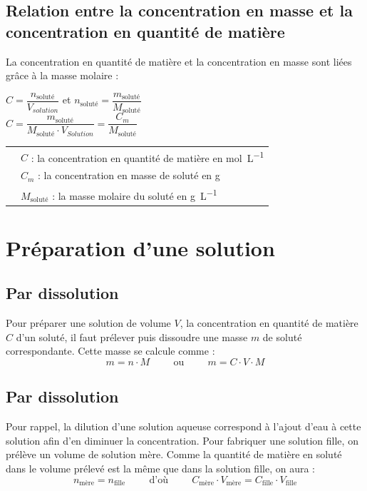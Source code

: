 \documentclass[a4paper,11pt,fleqn]{scrartcl}%
\begin{document}
	\subsection{Relation entre la concentration en masse et la concentration en quantité de matière}
	La concentration en quantité de matière et la concentration en masse sont liées grâce à la masse molaire :
	\begin{center}
	$C = \dfrac{n_{\text{soluté}}}{V_{solution}}$ et $n_{\text{soluté}} = \dfrac{m_{\text{soluté}}}{M_{\text{soluté}}}$\\
	$C = \dfrac{m_{\text{soluté}}}{M_{\text{soluté}}\cdot V_{Solution}} = \dfrac{C_m}{M_{\text{soluté}}}$
	\end{center}
	\begin{tabular}{>{\centering} m{6cm}|m{12cm}}
		\multirow{3}{*}{$C = \dfrac{C_m}{M_{\text{soluté}}}$} & $C$ : la concentration en quantité de matière  en \unit{\mole\per\liter}\\
		& $C_m$ : la concentration en masse de soluté en \unit{\gram}\\
		& $M_{\text{soluté}}$ : la masse molaire du soluté en \unit{\gram \per \liter}\\
	\end{tabular}
	
\section{Préparation d'une solution}
	\subsection{Par dissolution}
	Pour préparer une solution de volume $V$, la concentration en quantité de matière $C$ d'un soluté, il faut prélever puis dissoudre une masse $m$ de soluté correspondante. Cette masse se calcule comme : 
	$$ m = n \cdot M \hspace{1cm} \text{ou} \hspace{1cm} m = C \cdot V \cdot M$$
	
	\subsection{Par dissolution}
	Pour rappel, la dilution d'une solution aqueuse correspond à l'ajout d'eau à cette solution afin d'en diminuer la concentration. Pour fabriquer une solution fille, on prélève un volume de solution mère. Comme la quantité de matière en soluté dans le volume prélevé est la même que dans la solution fille, on aura :
	$$ n_{\text{mère}}= n_{\text{fille}} \hspace{1cm} \text{d'où} \hspace{1cm} C_{\text{mère}} \cdot V_{\text{mère}} = C_{\text{fille}} \cdot V_{\text{fille}}$$
\end{document}
